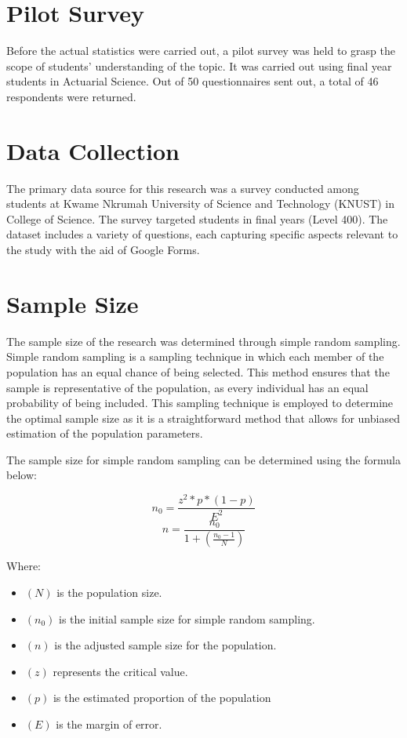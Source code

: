 \documentclass[doublespacing]{report} [12px]%
\begin{document}
\section{Pilot Survey}

Before the actual statistics were carried out, a pilot survey was held to grasp the scope of students’ understanding of the topic. It was carried out using final year students in Actuarial Science. Out of 50 questionnaires sent out, a total of 46 respondents were returned. 

\section{Data Collection}

The primary data source for this research was a survey conducted among students at Kwame Nkrumah University of Science and Technology (KNUST) in College of Science. The survey targeted students in final years (Level 400). The dataset includes a variety of questions, each capturing specific aspects relevant to the study with the aid of Google Forms.


\section{Sample Size}
The sample size of the research was determined through simple random sampling. Simple random sampling is a sampling technique in which each member of the population has an equal chance of being selected. This method ensures that the sample is representative of the population, as every individual has an equal probability of being included. This sampling technique is employed to determine the optimal sample size as it is a straightforward method that allows for unbiased estimation of the population parameters.

The sample size for simple random sampling can be determined using the formula below:

\begin{equation}
n_0=\frac{z^2 \ast p \ast \left(1-p\right)}{E^2}
\end{equation}
\begin{equation}
n=\frac{n_0}{1+(\frac{n_0-1}{N})}
\end{equation}

Where:
\begin{itemize}
    \item \((N)\) is the population size.
    \item \((n_0)\) is the initial sample size for simple random sampling.
    \item \((n)\) is the adjusted sample size for the population.
    \item \((z)\) represents the critical value.
    \item \((p)\) is the estimated proportion of the population
    \item \((E)\) is the margin of error.
\end{itemize}
\end{document}
